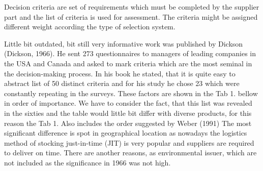 \documentclass[oneside,12pt]{article}%
\begin{document}
Decision criteria are set of requirements which must be completed by the supplier part and the list of criteria is used for assessment. The criteria might be assigned different weight according the type of selection system. \par
Little bit outdated, bit still very informative work was published by Dickson (Dickson, 1966). He sent 273 questionnaires to managers of leading companies in the USA and Canada and asked to mark criteria which are the most seminal in the decision-making process. In his book he stated, that it is quite easy to abstract list of 50 distinct criteria and for his study he chose 23 which were constantly repeating in the surveys. These factors are shown in the Tab 1. bellow in order of importance. We have to consider the fact, that this list was revealed in the sixties and the table would little bit differ with diverse products, for this reason the Tab 1. Also includes the order suggested by Weber (1991) The most significant difference is spot in geographical location as nowadays the logistics method of stocking just-in-time (JIT) is very popular and suppliers are required to deliver on time. There are another reasons, as environmental issuer, which are not included as the significance in 1966 was not high.
\end{document}
